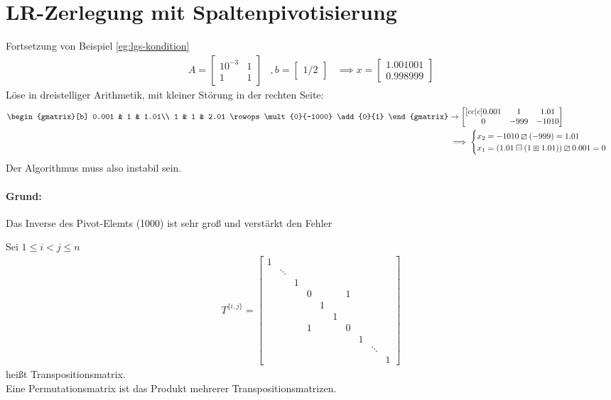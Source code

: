 \section{LR-Zerlegung mit Spaltenpivotisierung}
\begin{example}
	Fortsetzung von Beispiel \ref{eg:lgs-kondition}
	\begin{align*}
	A= \begin{bmatrix}
		10^{-3} & 1 \\
		1 & 1
	\end{bmatrix}
	&, b= \begin{bmatrix}
	1 / 2
	\end{bmatrix}
	&\implies x = \begin{bmatrix}
	1.001001 \\ 0.998999
	\end{bmatrix}
	\end{align*}
	Löse in dreistelliger Arithmetik, mit kleiner Störung in der rechten Seite:
	\begin{align*}
	\begin{gmatrix}[b]
		0.001 & 1 & 1.01\\
		1 & 1 & 2.01
\rowops
\mult{0}{-1000}
\add{0}{1}
\end{gmatrix}
&\to \begin{bmatrix}[cc|c]
	0.001 & 1 & 1.01 \\
	0 & -999 & -1010
\end{bmatrix}
\\ 
&\implies \begin{cases}
	x_2= -1010 \boxslash (-999) = 1.01 \\
	x_1= (1.01 \boxminus (1 \boxcircle 1.01)) \boxslash 0.001 = 0
\end{cases}
	\end{align*}
Der Algorithmus muss also instabil sein.
\end{example}
\paragraph{Grund:} Das Inverse des Pivot-Elemts (1000) ist sehr groß und verstärkt den Fehler

\begin{definition}
Sei $1\le i < j \le n$
\begin{align*}
T^{\{i,j\}} = \begin{bmatrix}
	1 \\
	& \ddots\\
	& & 1 \\
	& & & 0 & & & 1\\
	& & & & 1 \\
	& & & & & 1 \\
	& & & 1 & & & 0 \\
	& & & & & & & 1 \\
	& & & & & & & & \ddots \\
	& & & & & & & & &  1
\end{bmatrix}
\end{align*}
heißt Transpositionsmatrix.\\
Eine Permutationsmatrix ist das Produkt mehrerer Transpositionsmatrizen.
\end{definition}

